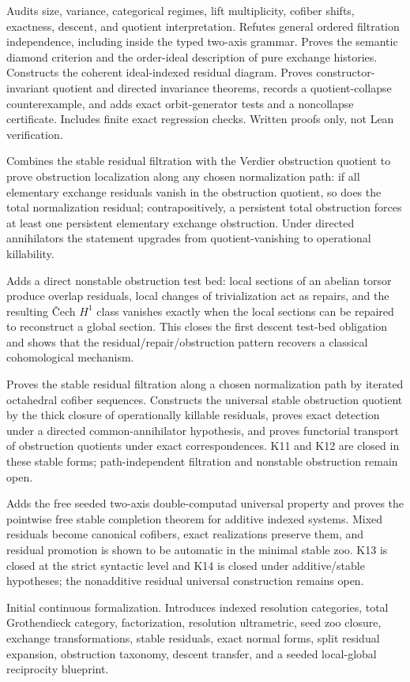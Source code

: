 \documentclass[11pt]{article}
\theoremstyle{definition}
\theoremstyle{remark}
\begin{document}
\begin{description}[leftmargin=8em,style=nextline]
\item[v0.6.0] Audits size, variance, categorical regimes, lift multiplicity, cofiber shifts, exactness, descent, and quotient interpretation. Refutes general ordered filtration independence, including inside the typed two-axis grammar. Proves the semantic diamond criterion and the order-ideal description of pure exchange histories. Constructs the coherent ideal-indexed residual diagram. Proves constructor-invariant quotient and directed invariance theorems, records a quotient-collapse counterexample, and adds exact orbit-generator tests and a noncollapse certificate. Includes finite exact regression checks. Written proofs only, not Lean verification.
\item[v0.5.0] Combines the stable residual filtration with the Verdier obstruction quotient to prove obstruction localization along any chosen normalization path: if all elementary exchange residuals vanish in the obstruction quotient, so does the total normalization residual; contrapositively, a persistent total obstruction forces at least one persistent elementary exchange obstruction. Under directed annihilators the statement upgrades from quotient-vanishing to operational killability.
\item[v0.4.0] Adds a direct nonstable obstruction test bed: local sections of an abelian torsor produce overlap residuals, local changes of trivialization act as repairs, and the resulting \v{C}ech $H^1$ class vanishes exactly when the local sections can be repaired to reconstruct a global section. This closes the first descent test-bed obligation and shows that the residual/repair/obstruction pattern recovers a classical cohomological mechanism.
\item[v0.3.0] Proves the stable residual filtration along a chosen normalization path by iterated octahedral cofiber sequences. Constructs the universal stable obstruction quotient by the thick closure of operationally killable residuals, proves exact detection under a directed common-annihilator hypothesis, and proves functorial transport of obstruction quotients under exact correspondences. K11 and K12 are closed in these stable forms; path-independent filtration and nonstable obstruction remain open.
\item[v0.2.0] Adds the free seeded two-axis double-computad universal property and proves the pointwise free stable completion theorem for additive indexed systems. Mixed residuals become canonical cofibers, exact realizations preserve them, and residual promotion is shown to be automatic in the minimal stable zoo. K13 is closed at the strict syntactic level and K14 is closed under additive/stable hypotheses; the nonadditive residual universal construction remains open.
\item[v0.1.0] Initial continuous formalization. Introduces indexed resolution categories, total Grothendieck category, factorization, resolution ultrametric, seed zoo closure, exchange transformations, stable residuals, exact normal forms, split residual expansion, obstruction taxonomy, descent transfer, and a seeded local-global reciprocity blueprint.
\end{description}
\endgroup
\end{document}
